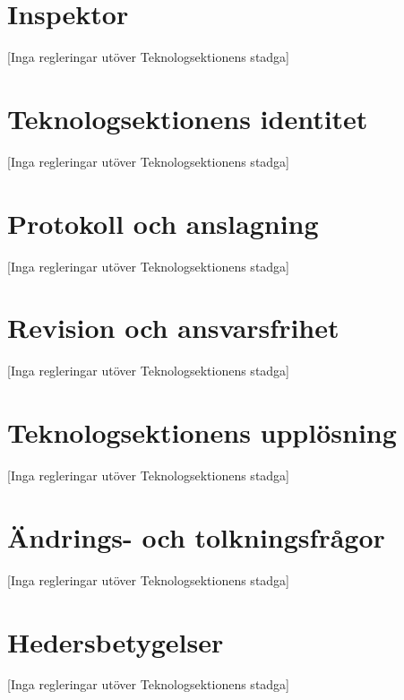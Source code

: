 \documentclass[a4paper]{dteklag}
\begin{document}
\section{Inspektor}
\begin{center}
  [Inga regleringar utöver Teknologsektionens stadga]
\end{center}
\section{Teknologsektionens identitet}
\begin{center}
  [Inga regleringar utöver Teknologsektionens stadga]
\end{center}
\section{Protokoll och anslagning}
\begin{center}
  [Inga regleringar utöver Teknologsektionens stadga]
\end{center}
\section{Revision och ansvarsfrihet}
\begin{center}
  [Inga regleringar utöver Teknologsektionens stadga]
\end{center}
\section{Teknologsektionens upplösning}
\begin{center}
  [Inga regleringar utöver Teknologsektionens stadga]
\end{center}
\section{Ändrings- och tolkningsfrågor}
\begin{center}
  [Inga regleringar utöver Teknologsektionens stadga]
\end{center}
\section{Hedersbetygelser}
\begin{center}
  [Inga regleringar utöver Teknologsektionens stadga]
\end{center}
\end{document}

